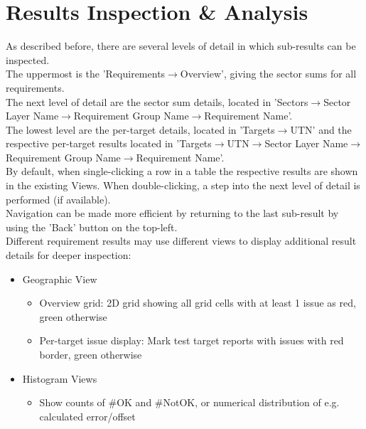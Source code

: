 \section{Results Inspection \& Analysis}
\label{sec:eval_inspect}

As described before, there are several levels of detail in which sub-results can be inspected.\\

The uppermost is the 'Requirements$\rightarrow$Overview', giving the sector sums for all requirements. \\

The next level of detail are the sector sum details, located in 'Sectors$\rightarrow$Sector Layer Name$\rightarrow$Requirement Group Name$\rightarrow$Requirement Name'. \\

The lowest level are the per-target details, located in 'Targets$\rightarrow$UTN' and the respective per-target results located in 'Targets$\rightarrow$UTN$\rightarrow$Sector Layer Name$\rightarrow$Requirement Group Name$\rightarrow$Requirement Name'. \\

By default, when single-clicking a row in a table the respective results are shown in the existing Views. When double-clicking, a step into the next level of detail is performed (if available). \\

Navigation can be made more efficient by returning to the last sub-result by using the 'Back' button on the top-left. \\

Different requirement results may use different views to display additional result details for deeper inspection:

\begin{itemize}  
\item Geographic View
\begin{itemize}  
\item Overview grid: 2D grid showing all grid cells with at least 1 issue as red, green otherwise
\item Per-target issue display: Mark test target reports with issues with red border, green otherwise
\end{itemize}
\item Histogram Views
\begin{itemize}  
\item Show counts of \#OK and \#NotOK, or numerical distribution of e.g. calculated error/offset
\end{itemize}
\end{itemize}
\ \\

